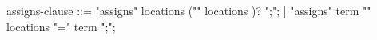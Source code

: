 \begin{syntax}
assigns-clause ::= "assigns" locations ("\from" locations )? ";";
                 | "assigns" term "\from" locations {"=" term ";"};
\end{syntax}